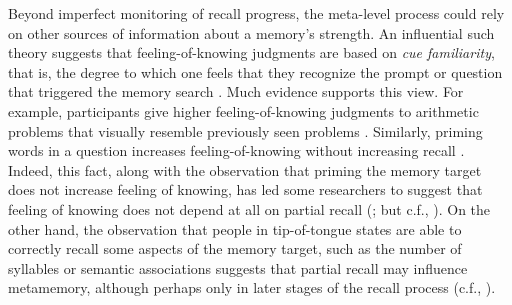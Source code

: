 Beyond imperfect monitoring of recall progress, the meta-level process could rely on other sources of information about a memory's strength. An influential such theory suggests that feeling-of-knowing judgments are based on \emph{cue familiarity}, that is, the degree to which one feels that they recognize the prompt or question that triggered the memory search \citep{metcalfe1993cuefamiliarity}. Much evidence supports this view. For example, participants give higher feeling-of-knowing judgments to arithmetic problems that visually resemble previously seen problems \citep{reder1992determines}. Similarly, priming words in a question increases feeling-of-knowing without increasing recall \citep{reder1987strategy,reder1988strategic,schwartz1992cue}. Indeed, this fact, along with the observation that priming the memory target does not increase feeling of knowing, has led some researchers to suggest that feeling of knowing does not depend at all on partial recall (\citealp{reder1992determines,schwartz1992cue}; but c.f., \citealp{jameson1990influence,narens1994subthreshold}). On the other hand, the observation that people in tip-of-tongue states are able to correctly recall some aspects of the memory target, such as the number of syllables \citep{brown1966tip} or semantic associations \citep{koriat1993how,schacter1985attribute} suggests that partial recall may influence metamemory, although perhaps only in later stages of the recall process (c.f., \citealp{nhouyvanisvong1998rapid}).

